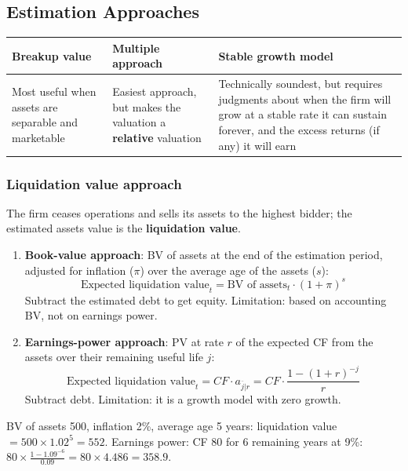 \subsection{Estimation Approaches}
\begin{center}
\small
\begin{tabular}{@{}p{4.3cm}p{4.3cm}p{5.6cm}@{}}
\toprule
\textbf{Breakup value} & \textbf{Multiple approach} & \textbf{Stable growth model}\\
\midrule
Most useful when assets are separable and marketable & Easiest approach, but makes the valuation a \textbf{relative} valuation & Technically soundest, but requires judgments about when the firm will grow at a stable rate it can sustain forever, and the excess returns (if any) it will earn\\
\bottomrule
\end{tabular}
\end{center}

\subsubsection*{Liquidation value approach}
The firm ceases operations and sells its assets to the highest bidder; the estimated assets value is the \textbf{liquidation value}.
\begin{enumerate}
  \item \textbf{Book-value approach}: BV of assets at the end of the estimation period, adjusted for inflation ($\pi$) over the average age of the assets ($s$):
  \[
  \text{Expected liquidation value}_t=\text{BV of assets}_t\cdot(1+\pi)^s
  \]
  Subtract the estimated debt to get equity. Limitation: based on accounting BV, not on earnings power.
  \item \textbf{Earnings-power approach}: PV at rate $r$ of the expected CF from the assets over their remaining useful life $j$:
  \[
  \text{Expected liquidation value}_t=CF\cdot a_{\overline{j}|r}=CF\cdot\frac{1-(1+r)^{-j}}{r}
  \]
  Subtract debt. Limitation: it is a growth model with zero growth.
\end{enumerate}
\begin{exbox}
BV of assets 500, inflation 2\%, average age 5 years: liquidation value $=500\times1.02^5=552$. Earnings power: CF 80 for 6 remaining years at 9\%: $80\times\frac{1-1.09^{-6}}{0.09}=80\times4.486=358.9$.
\end{exbox}


